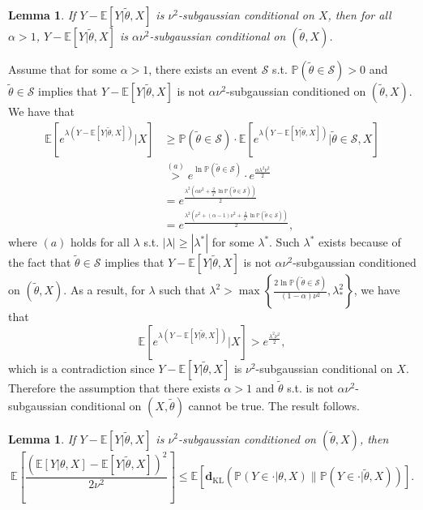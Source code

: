 \documentclass[twoside,11pt]{article}
\renewenvironment{proof}{\par\noindent{\bf Proof\ }}{\hfill\BlackBox\\[2mm]}
\newenvironment{proof}{\par\noindent{\bf Proof\ }}{\hfill\BlackBox\\[2mm]}
\newtheorem{lemma}[theorem]{Lemma}
\def\KL{\mathbf{d}_{\mathrm{KL}}}
\def\proxytheta{\tilde{\theta}}
\def\subgauss{\nu^2}
\def\E{\mathbb{E}}
\def\Pr{\mathbb{P}}
\begin{document}
\begin{lemma}
    \label{le:subgaussian2}
    If $Y-\E[Y|\proxytheta, X]$ is $\subgauss$-subgaussian conditional on $X$, then for all $\alpha>1$, $Y-\E[Y|\proxytheta, X]$ is $\alpha\subgauss$-subgaussian conditional on $(\proxytheta, X)$.
\end{lemma}
\begin{proof}
    Assume that for some $\alpha > 1$, there exists an event $\mathcal{S}$ s.t. $\Pr(\proxytheta \in \mathcal{S}) > 0$ and $\proxytheta \in \mathcal{S}$ implies that $Y-\E[Y|\proxytheta, X]$ is not $\alpha\subgauss$-subgaussian conditioned on $(\proxytheta, X)$. We have that
    \begin{align*}
        \E\left[e^{\lambda(Y-\E[Y|\proxytheta, X])}\big|X\right]
        & \geq \Pr(\proxytheta\in\mathcal{S})\cdot \E\left[e^{\lambda(Y-\E[Y|\proxytheta, X])}|\proxytheta\in\mathcal{S}, X\right]\\
        & \overset{(a)}{>} e^{\ln\Pr(\proxytheta \in \mathcal{S})}\cdot e^{\frac{\alpha\lambda^2\subgauss}{2}}\\
        & = e^{\frac{\lambda^2\left(\alpha\subgauss + \frac{2}{\lambda^2}\ln\Pr(\proxytheta\in\mathcal{S})\right)}{2}}\\
        & = e^{\frac{\lambda^2\left(\subgauss + (\alpha-1)\subgauss + \frac{2}{\lambda^2}\ln\Pr(\proxytheta\in\mathcal{S})\right)}{2}},
    \end{align*}
    where $(a)$ holds for all $\lambda$ s.t. $|\lambda| \geq |\lambda^*|$ for some $\lambda^*$. Such $\lambda^*$ exists because of the fact that $\proxytheta\in\mathcal{S}$ implies that $Y-\E[Y|\proxytheta, X]$ is not $\alpha\subgauss$-subgaussian conditioned on $(\proxytheta, X)$. As a result, for $\lambda$ such that $\lambda^2 > \max\left\{\frac{2\ln\Pr(\proxytheta\in\mathcal{S})}{(1-\alpha)\subgauss}, \lambda_*^2\right\}$, we have that
    $$\E\left[e^{\lambda(Y-\E[Y|\proxytheta, X])}\big|X\right] > e^{\frac{\lambda^2\subgauss}{2}},$$
    which is a contradiction since $Y-\E[Y|\proxytheta, X]$ is $\subgauss$-subgaussian conditional on $X$. Therefore the assumption that there exists $\alpha > 1$ and $\proxytheta$ s.t. is not $\alpha\nu^2$-subgaussian conditional on $(X, \proxytheta)$ cannot be true. The result follows.
\end{proof}
\begin{lemma}
    \label{le:mse_kl_inequality}
    If $Y-\E[Y|\proxytheta, X]$ is $\subgauss$-subgaussian conditioned on $(\proxytheta, X)$, then
    $$\E\left[\frac{\left(\E[Y|\theta,X] - \E[Y|\proxytheta, X]\right)^2}{2\subgauss}\right] \leq \E\left[\KL(\Pr(Y\in\cdot|\theta, X)\|\Pr(Y\in\cdot|\proxytheta, X))\right].$$
\end{lemma}
\end{document}

